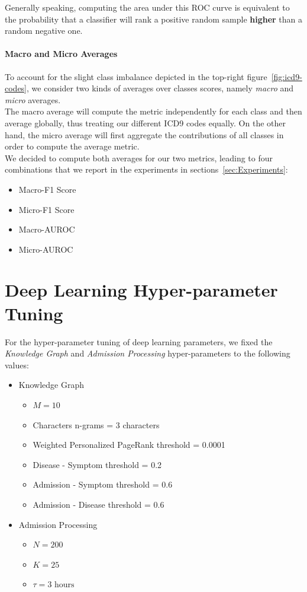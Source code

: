 Generally speaking, computing the area under this ROC curve is equivalent to the probability that a classifier will rank a positive random sample \textbf{higher} than a random negative one.

\paragraph{Macro and Micro Averages} To account for the slight class imbalance depicted in the top-right figure~\ref{fig:icd9-codes}, we consider two kinds of averages over classes scores, namely \emph{macro} and \emph{micro} averages. \\

The macro average will compute the metric independently for each class and then average globally, thus treating our different ICD9 codes equally. On the other hand, the micro average will first aggregate the contributions of all classes in order to compute the average metric. \\

We decided to compute both averages for our two metrics, leading to four combinations that we report in the experiments in sections~\ref{sec:Experiments}:

\begin{itemize}
 \item Macro-F1 Score
 \item Micro-F1 Score
 \item Macro-AUROC
 \item Micro-AUROC
\end{itemize}

\newpage
\section{Deep Learning Hyper-parameter Tuning}
For the hyper-parameter tuning of deep learning parameters, we fixed the \emph{Knowledge Graph} and \emph{Admission Processing} hyper-parameters to the following values:

\begin{itemize}
 \item Knowledge Graph
 \begin{itemize}
  \item $M=10$
  \item Characters n-grams = 3 characters
  \item Weighted Personalized PageRank threshold = 0.0001
  \item Disease - Symptom threshold = 0.2
  \item Admission - Symptom threshold = 0.6
  \item Admission - Disease threshold = 0.6
 \end{itemize}
 \item Admission Processing
 \begin{itemize}
  \item $N = 200$
  \item $K = 25$
  \item $\tau = 3 \mbox{ hours}$
 \end{itemize}
\end{itemize}
